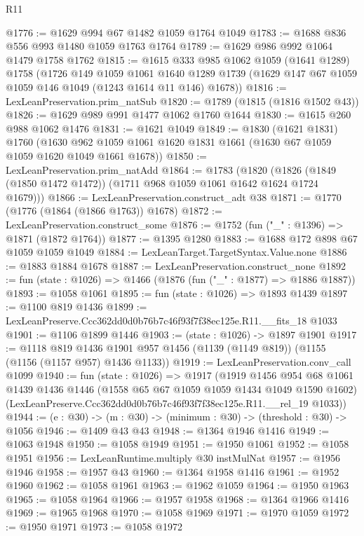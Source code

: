 \begin{lexlean}{R11}
\begin{coremodule}
@1776 := @1629 @994 @67 @1482 @1059 @1764 @1049
@1783 := @1688 @836 @556 @993 @1480 @1059 @1763 @1764
@1789 := @1629 @986 @992 @1064 @1479 @1758 @1762
@1815 := @1615
    @333
    @985
    @1062
    @1059
    (@1641 @1289)
    @1758
    (@1726
      @149
      @1059
      @1061
      @1640
      @1289
      @1739
      (@1629 @147 @67 @1059 @1059 @146 @1049 (@1243 @1614 @11 @146) @1678))
@1816 := LexLeanPreservation.prim_natSub
@1820 := @1789 (@1815 (@1816 @1502 @43))
@1826 := @1629 @989 @991 @1477 @1062 @1760 @1644
@1830 := @1615 @260 @988 @1062 @1476
@1831 := @1621 @1049
@1849 := @1830
    (@1621 @1831)
    @1760
    (@1630 @962 @1059 @1061 @1620 @1831 @1661 (@1630 @67 @1059 @1059 @1620 @1049 @1661 @1678))
@1850 := LexLeanPreservation.prim_natAdd
@1864 := @1783
    (@1820 (@1826 (@1849 (@1850 @1472 @1472)) (@1711 @968 @1059 @1061 @1642 @1624 @1724 @1679)))
@1866 := LexLeanPreservation.construct_adt @38
@1871 := @1770 (@1776 (@1864 (@1866 @1763)) @1678)
@1872 := LexLeanPreservation.construct_some
@1876 := @1752 (fun ("_" : @1396) => @1871 (@1872 @1764))
@1877 := @1395 @1280
@1883 := @1688 @172 @898 @67 @1059 @1059 @1049
@1884 := LexLeanTarget.TargetSyntax.Value.none
@1886 := @1883 @1884 @1678
@1887 := LexLeanPreservation.construct_none
@1892 := fun (state : @1026) => @1466 (@1876 (fun ("_" : @1877) => @1886 @1887))
@1893 := @1058 @1061
@1895 := fun (state : @1026) => @1893 @1439
@1897 := @1100 @819 @1436
@1899 := LexLeanPreserve.Ccc362dd0d0b76b7c46f93f7f38ec125e.R11.__fits_18 @1033
@1901 := @1106 @1899 @1446
@1903 := (state : @1026) -> @1897 @1901
@1917 := @1118
    @819
    @1436
    @1901
    @957
    @1456
    (@1139 (@1149 @819))
    (@1155 (@1156 (@1157 @957) @1436 @1133))
@1919 := LexLeanPreservation.conv_call @1099
@1940 := fun (state : @1026) =>
  @1917
    (@1919
      @1456
      @954
      @68
      @1061
      @1439
      @1436
      @1446
      (@1558 @65 @67 @1059 @1059 @1434 @1049 @1590 @1602)
      (LexLeanPreserve.Ccc362dd0d0b76b7c46f93f7f38ec125e.R11.__rel_19 @1033))
@1944 := (e : @30) -> (m : @30) -> (minimum : @30) -> (threshold : @30) -> @1056
@1946 := @1409 @43 @43
@1948 := @1364 @1946 @1416
@1949 := @1063 @1948
@1950 := @1058 @1949
@1951 := @1950 @1061
@1952 := @1058 @1951
@1956 := LexLeanRuntime.multiply @30 instMulNat
@1957 := @1956 @1946
@1958 := @1957 @43
@1960 := @1364 @1958 @1416
@1961 := @1952 @1960
@1962 := @1058 @1961
@1963 := @1962 @1059
@1964 := @1950 @1963
@1965 := @1058 @1964
@1966 := @1957 @1958
@1968 := @1364 @1966 @1416
@1969 := @1965 @1968
@1970 := @1058 @1969
@1971 := @1970 @1059
@1972 := @1950 @1971
@1973 := @1058 @1972

\end{coremodule}
\end{lexlean}
